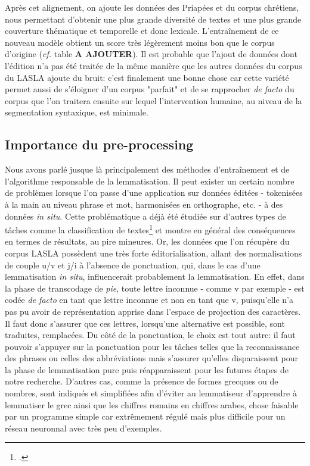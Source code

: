 Après cet alignement, on ajoute les données des Priapées et du corpus chrétiens, nous permettant d'obtenir une plus grande diversité de textes et une plus grande couverture thématique et temporelle et donc lexicale. L'entraînement de ce nouveau modèle obtient un score très légèrement moins bon que le corpus d'origine (\textit{cf.} table \textbf{A AJOUTER}). Il est probable que l'ajout de données dont l'édition n'a pas été traitée de la même manière que les autres données du corpus du LASLA ajoute du bruit: c'est finalement une bonne chose car cette variété permet aussi de s'éloigner d'un corpus "parfait" et de se rapprocher \textit{de facto} du corpus que l'on traitera ensuite sur lequel l'intervention humaine, au niveau de la segmentation syntaxique, est minimale.

\subsection{Importance du pre-processing}

Nous avons parlé jusque là principalement des méthodes d'entraînement et de l'algorithme responsable de la lemmatisation. Il peut exister un certain nombre de problèmes lorsque l'on passe d'une application sur données éditées - tokenisées à la main au niveau phrase et mot, harmonisées en orthographe, etc. - à des données \textit{in situ}. Cette problématique a déjà été étudiée sur d'autres types de tâches comme la classification de textes\footcite{camacho-collados_role_2018} et montre en général des conséquences en termes de résultats, au pire mineures. Or, les données que l'on récupère du corpus LASLA possèdent une très forte éditorialisation, allant des normalisations de couple u/v et j/i à l'absence de ponctuation, qui, dans le cas d'une lemmatisation \textit{in situ}, influencerait probablement la lemmatisation. En effet, dans la phase de transcodage de \textit{pie}, toute lettre inconnue - comme v par exemple - est codée \textit{de facto} en tant que lettre inconnue et non en tant que v, puisqu'elle n'a pas pu avoir de représentation apprise dans l'espace de projection des caractères. Il faut donc s'assurer que ces lettres, lorsqu'une alternative est possible, sont traduites, remplacées. Du côté de la ponctuation, le choix est tout autre: il faut pouvoir s'appuyer sur la ponctuation pour les tâches telles que la reconnaissance des phrases ou celles des abbréviations mais s'assurer qu'elles disparaissent pour la phase de lemmatisation pure puis réapparaissent pour les futures étapes de notre recherche. D'autres cas, comme la présence de formes grecques ou de nombres, sont indiqués et simplifiées afin d'éviter au lemmatiseur d'apprendre à lemmatiser le grec ainsi que les chiffres romains en chiffres arabes, chose faisable par un programme simple car extrêmement régulé mais plus difficile pour un réseau neuronnal avec très peu d'exemples.

